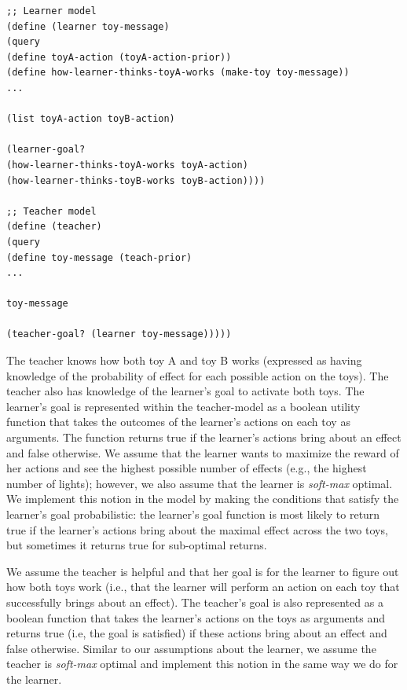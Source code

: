 \documentclass[10pt,letterpaper]{article}
\begin{document}
\begin{lstlisting}
;; Learner model
(define (learner toy-message)
(query
(define toyA-action (toyA-action-prior))
(define how-learner-thinks-toyA-works (make-toy toy-message))
...

(list toyA-action toyB-action) 

(learner-goal? 			
(how-learner-thinks-toyA-works toyA-action) 
(how-learner-thinks-toyB-works toyB-action))))

;; Teacher model
(define (teacher)
(query
(define toy-message (teach-prior)
...

toy-message 

(teacher-goal? (learner toy-message))))) 
\end{lstlisting}

The teacher knows how both toy A and toy B works (expressed as having knowledge of the probability of effect for each possible action on the toys). The teacher also has knowledge of the learner's goal to activate both toys. The learner's goal is represented within the teacher-model as a boolean utility function that takes the outcomes of the learner's actions on each toy as arguments. The function returns true if the learner's actions bring about an effect and false otherwise. We assume that the learner wants to maximize the reward of her actions and see the highest possible number of effects (e.g., the highest number of lights); however, we also assume that the learner is \textit{soft-max} optimal. We implement this notion in the model by making the conditions that satisfy the learner's goal probabilistic: the learner's goal function is most likely to return true if the learner's actions bring about the maximal effect across the two toys, but sometimes it returns true for sub-optimal returns. 

We assume the teacher is helpful and that her goal is for the learner to figure out how both toys work (i.e., that the learner will perform an action on each toy that successfully brings about an effect). The teacher's goal is also represented as a boolean function that takes the learner's actions on the toys as arguments and returns true (i.e, the goal is satisfied) if these actions bring about an effect and false otherwise. Similar to our assumptions about the learner, we assume the teacher is \textit{soft-max} optimal and implement this notion in the same way we do for the learner. 
\end{document}
